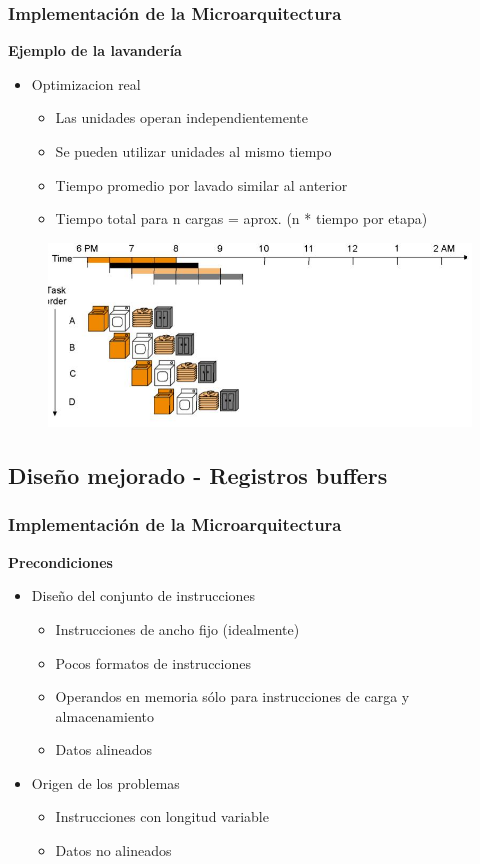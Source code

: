 \documentclass[aspectratio=169,compress]{beamer}
\begin{document}
\begin{footnotesize}
\begin{frame}
\frametitle{Implementación de la Microarquitectura}
\begin{center}\textbf{Ejemplo de la lavandería}\end{center}
\begin{itemize}
\item Optimizacion real
\begin{itemize}
\item Las unidades operan independientemente
\item Se pueden utilizar unidades al mismo tiempo
\item Tiempo promedio por lavado similar al anterior
\item Tiempo total para n cargas = aprox. (n * tiempo por etapa)
\end{itemize}
\end{itemize}
\begin{figure}
\includegraphics[scale=0.4]{images/lavanderia2.jpg} 
\end{figure}
\end{frame}


\subsection{Diseño mejorado - Registros buffers}


\begin{frame}
\frametitle{Implementación de la Microarquitectura}
\begin{center}\textbf{Precondiciones}\end{center}
\begin{itemize}
\item Diseño del conjunto de instrucciones
\begin{itemize}
\item Instrucciones de ancho fijo (idealmente)
\item Pocos formatos de instrucciones
\item Operandos en memoria sólo para instrucciones de carga y almacenamiento
\item Datos alineados
\end{itemize}
\end{itemize}
\begin{itemize}
\item Origen de los problemas
\begin{itemize}
\item Instrucciones con longitud variable
\item Datos no alineados
\end{itemize}
\end{itemize}


\end{frame}
\end{footnotesize}
\end{document}
